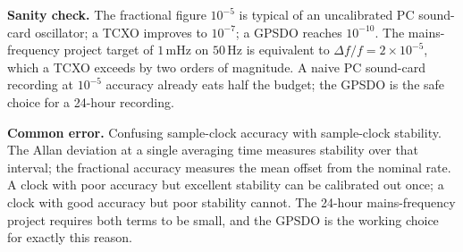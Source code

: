 \begin{exercise}
\textbf{Sanity check.} The fractional figure $10^{-5}$ is typical
of an uncalibrated PC sound-card oscillator; a TCXO improves to
$10^{-7}$; a GPSDO reaches $10^{-10}$. The mains-frequency project
target of $1 \,\si{\milli\hertz}$ on $50 \,\si{\hertz}$ is
equivalent to $\Delta f/f = 2 \times 10^{-5}$, which a TCXO
exceeds by two orders of magnitude. A naive PC sound-card
recording at $10^{-5}$ accuracy already eats half the budget; the
GPSDO is the safe choice for a 24-hour recording.

\textbf{Common error.} Confusing sample-clock accuracy with
sample-clock stability. The Allan deviation at a single
averaging time measures stability over that interval; the
fractional accuracy measures the mean offset from the nominal
rate. A clock with poor accuracy but excellent stability can be
calibrated out once; a clock with good accuracy but poor
stability cannot. The 24-hour mains-frequency project requires
both terms to be small, and the GPSDO is the working choice for
exactly this reason.
\end{exercise}

